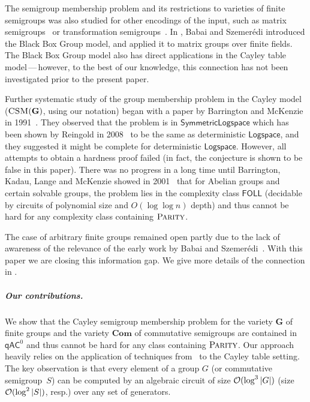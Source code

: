 \documentclass{toc}
\newcommand{\abs}[1]{\ensuremath\left|#1\right|}
\newcommand{\FOLL}{\ensuremath{\mathsf{FOLL}}}
\newcommand{\qAC}{\ensuremath{\mathsf{qAC}}}
\newcommand{\LOGSPACE}{\ensuremath{\mathsf{Logspace}}}
\newcommand{\vCom}{\mathbf{Com}}
\newcommand{\vG}{\mathbf{G}}
\newcommand{\CSM}{\ensuremath{\textsc{CSM}}}
\newcommand{\Parity}{\ensuremath{\textsc{Parity}}}
\newcommand{\SCSM}{Cayley semigroup membership}
\newcommand{\SCSMP}{{\SCSM} problem}
\begin{document}
The semigroup membership problem and its restrictions to varieties of finite
semigroups was also studied for other encodings of the input, such as matrix
semigroups~\cite{Babai85,BabaiS84,BabaiBIL96} or transformation
semigroups~\cite{Sims1967,FurstHopcroftLuks80,BabaiLS87,Beaudry88,BeaudryMT92,Beaudry94,Beaudry88thesis}.
%
In \cite{BabaiS84}, Babai and Szemer\'edi introduced the Black Box Group model,
and applied it to matrix groups over finite fields. The Black Box Group model
also has direct applications in the Cayley table model\,---\,however, to the
best of our knowledge, this connection has not been investigated prior to the
present paper.

Further systematic study of the group membership problem in the Cayley model
($\CSM(\vG)$, using our notation) began with a paper by Barrington and McKenzie
in 1991~\cite{BarringtonM91}.
%
They observed that the problem is in %
$\mathsf{SymmetricLogspace}$  %
which has been shown 
by Reingold in 2008~\cite{Reingold08} %
to be the same as deterministic %
$\LOGSPACE$,
%
and
they  %
suggested it might be complete for deterministic %
$\LOGSPACE$.
However, all attempts to obtain a hardness proof failed (in fact,
the conjecture is shown to be false in this %
paper).  %
%
There was no progress in a long time until Barrington, Kadau, Lange and
McKenzie showed  %
in 2001~\cite{BarringtonKLM01}  %
that for Abelian groups and certain solvable groups, the
problem lies in the complexity class $\FOLL$ %
(decidable by circuits of polynomial size and $O(\log\log n)$ depth) %
and thus cannot be hard for any
complexity class containing $\Parity$. 
%

The case of arbitrary finite groups remained open partly due to the lack of
awareness of the relevance of the early work by Babai and
Szemer\'edi~\cite{BabaiS84}.  %
With this paper we are closing this information gap. We give more
details of the connection in .

\subparagraph{Our contributions.}  %
%

We show that the {\SCSMP} for the variety
%
$\vG$ of finite groups   %
and the variety 
%
$\vCom$ of commutative semigroups %
%
are   %
contained in $\qAC^0$ and thus
cannot be hard for any class containing $\Parity$.
%
Our approach heavily relies on the application of techniques
from~\cite{BabaiS84} to the Cayley table setting.
%
The key observation is that every element of a group $G$
%
(or commutative    %
semigroup~$S$) can be computed by an algebraic circuit of size
$\mathcal{O}(\log^3 \abs{G})$  
%
(size $\mathcal{O}(\log^2 \abs{S})$, resp.)  %
over any set of generators.
\end{document}
